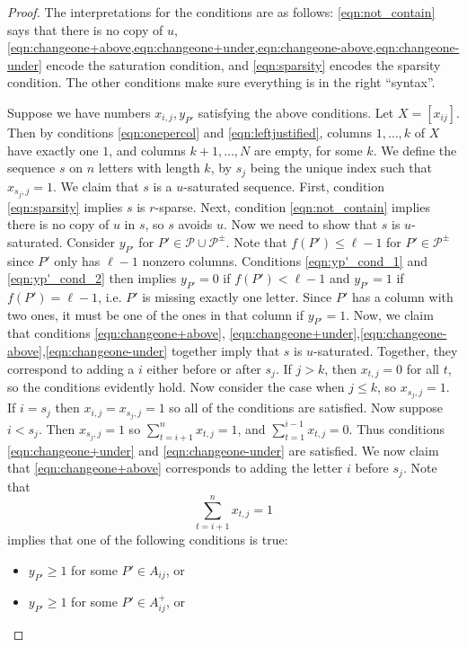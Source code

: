\documentclass[12pt]{amsart}
\theoremstyle{definition}
\numberwithin{equation}{section}
\numberwithin{table}{thm}
\begin{document}
\begin{proof}
    The interpretations for the conditions are as follows: \cref{eqn:not_contain} says that there is no copy of $u$, \cref{eqn:changeone+above,eqn:changeone+under,eqn:changeone-above,eqn:changeone-under} encode the saturation condition, and \cref{eqn:sparsity} encodes the sparsity condition. The other conditions make sure everything is in the right ``syntax''. 
    
    Suppose we have numbers $x_{i,j},y_{P'}$ satisfying the above conditions. Let $X = [x_{ij}]$. Then by conditions \eqref{eqn:onepercol} and \eqref{eqn:leftjustified}, columns $1,\dots, k$ of $X$ have exactly one $1$, and columns $k+1,\dots, N$ are empty, for some $k$. We define the sequence $s$ on $n$ letters with length $k$, by $s_{j}$ being the unique index such that $x_{s_j,j}=1$. We claim that $s$ is a $u$-saturated sequence. First, condition \eqref{eqn:sparsity} implies $s$ is $r$-sparse. Next, condition \eqref{eqn:not_contain} implies there is no copy of $u$ in $s$, so $s$ avoids $u$. Now we need to show that $s$ is $u$-saturated. Consider $y_{P'}$ for $P'\in \mathcal P \cup \mathcal P^{\pm}$. Note that $f(P')\le \ell-1$ for $P'\in \mathcal P^{\pm}$ since $P'$ only has $\ell-1$ nonzero columns. Conditions \eqref{eqn:yp'_cond_1} and \eqref{eqn:yp'_cond_2} then implies $y_{P'}=0$ if $f(P')<\ell-1$ and $y_{P'}=1    $ if $f(P')=\ell-1$, i.e. $P'$ is missing exactly one letter. Since $P'$ has a column with two ones, it must be one of the ones in that column if $y_{P'}=1$. Now, we claim that conditions \eqref{eqn:changeone+above}, \eqref{eqn:changeone+under},\eqref{eqn:changeone-above},\eqref{eqn:changeone-under} together imply that $s$ is $u$-saturated. Together, they correspond to adding a $i$ either before or after $s_j$. If $j>k$, then $x_{t,j}=0$ for all $t$, so the conditions evidently hold. Now consider the case when $j\le k$, so $x_{s_j,j}=1$. If $i=s_j$ then $x_{i,j}=x_{s_j,j}=1$ so all of the conditions are satisfied. Now suppose $i<s_j$. Then $x_{s_j,j}=1$ so $\sum_{t=i+1}^n x_{t,j}=1$, and $\sum_{t=1}^{i-1}x_{t,j}=0$. Thus conditions \eqref{eqn:changeone+under} and \eqref{eqn:changeone-under} are satisfied. We now claim that \eqref{eqn:changeone+above} corresponds to adding the letter $i$ before $s_j$. Note that \[\sum_{t=i+1}^{n} x_{t,j}=1\] implies that one of the following conditions is true:
    \begin{itemize}
    \setlength\itemsep{5pt}
        \item  $y_{P'}\ge 1$ for some $P'\in A_{ij}$, or
        \item $y_{P'}\ge 1$ for some $P'\in A_{ij}^+$, or

\end{itemize}
\end{proof}
\end{document}
